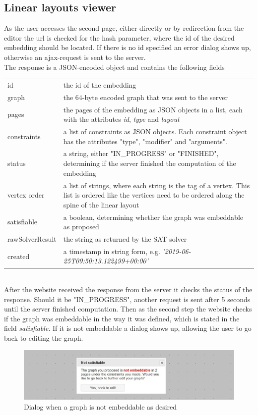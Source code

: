 \subsection{Linear layouts viewer}
\label{viewerOV}
As the user accesses the second page, either directly or by redirection from the editor the url is checked for the hash parameter, where the id of the desired embedding should be located. If there is no id specified an error dialog shows up, otherwise an ajax-request is sent to the server.\\
The response is a JSON-encoded object and contains the following fields \cite{linearLayoutApi}\\[12px]
\begin{tabular}{l p{}}
id & the id of the embedding\\
graph & the 64-byte encoded graph that was sent to the server\\
pages & the pages of the embedding as JSON objects in a list, each with the attributes \textit{id}, \textit{type} and \textit{layout}\\
constraints & a list of constraints as JSON objects. Each constraint object has the attributes "type", "modifier" and "arguments".\\
status & a string, either "IN\_PROGRESS" or "FINISHED", determining if the server finished the computation of the embedding\\
vertex order & a list of strings, where each string is the tag of a vertex. This list is ordered like the vertices need to be ordered along the spine of the linear layout\\
satisfiable & a boolean, determining whether the graph was embeddable as proposed\\
rawSolverResult & the string as returned by the SAT solver\\
created & a timestamp in string form, e.g. \textit{'2019-06-25T09:50:13.122499+00:00'}
\end{tabular}\\[12pt]
After the website received the response from the server it checks the status of the response. Should it be "IN\_PROGRESS", another request is sent after 5 seconds until the server finished computation. Then as the second step the website checks if the graph was embeddable in the way it was defined, which is stated in the field \textit{satisfiable}. If it is not embeddable a dialog shows up, allowing the user to go back to editing the graph.\\
\begin{figure}
\begin{center}
\includegraphics[width=\textwidth]{figures/figSecond/NotEmbeddable.jpg}
\caption{Dialog when a graph is not embeddable as desired}
\end{center}
\label{notSat}
\end{figure}
